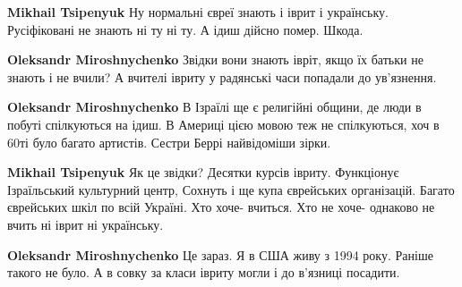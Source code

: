 \begin{itemize}
\begin{itemize}
\begin{itemize}
\textbf{Mikhail Tsipenyuk} Ну нормальні євреї знають і іврит і українську. Русіфіковані не знають ні ту ні ту. А ідиш дійсно помер. Шкода.

 
\textbf{Oleksandr Miroshnychenko} Звідки вони знають івріт, якщо їх батьки не знають і не вчили? А вчителі івриту у радянські часи попадали до ув'язнення.

 
\textbf{Oleksandr Miroshnychenko} В Ізраїлі ще є религійні общини, де люди в побуті спілкуються на ідиш. В Америці цією мовою теж не спілкуються, хоч в 60ті було багато артистів. Сестри Беррі найвідоміши зірки.

 
\textbf{Mikhail Tsipenyuk} Як це звідки? Десятки курсів івриту. Функціонує Ізраїльський культурний центр, Сохнуть і ще купа єврейських організацій. Багато єврейських шкіл по всій Україні. Хто хоче- вчиться. Хто не хоче- однаково не вчить ні іврит ні українську.

 
\textbf{Oleksandr Miroshnychenko} Це зараз. Я в США живу з 1994 року. Раніше такого не було. А в совку за класи івриту могли і до в'язниці посадити.

 


\end{itemize}
\end{itemize}
\end{itemize}
